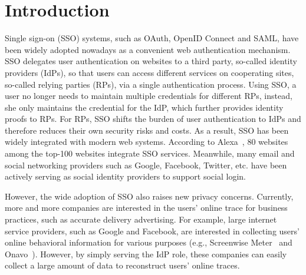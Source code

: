 \section{Introduction}
\label{sec:intro}

Single sign-on (SSO) systems, such as OAuth, OpenID Connect and SAML, have been widely adopted nowadays as a convenient web authentication mechanism. SSO delegates user authentication on websites to a third party, so-called identity providers (IdPs), so that users can access different services on cooperating sites, so-called relying parties (RPs), via a single authentication process. Using SSO, a user no longer needs to maintain multiple credentials for different RPs, instead, she only maintains the credential for the IdP, which further provides identity proofs to RPs.
For RPs, SSO shifts the burden of user authentication to IdPs and therefore reduces their own security risks and costs. As a result, SSO has been widely integrated with modern web systems.
According to Alexa~\cite{Alexa}, 80 websites among the top-100 websites integrate SSO services. Meanwhile, many email and social networking providers such as Google, Facebook, Twitter, etc. have been actively serving as social identity providers to support social login.

However, the wide adoption of SSO also raises new privacy concerns. Currently, more and more companies are interested in the users' online trace for business practices, such as accurate delivery advertising. For example, large internet service providers, such as Google and Facebook, are interested in collecting users' online behavioral information for various purposes (e.g., Screenwise Meter~\cite{googlenews} and Onavo~\cite{Onavo}). However, by simply serving the IdP role, these companies can easily collect a large amount of data to reconstruct users' online traces. 


